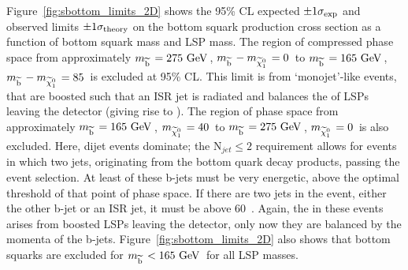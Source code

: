 Figure~\ref{fig:sbottom_limits_2D} shows the 95\% CL expected $\pm 1 \sigma_{\rm exp}$ and observed limits $\pm 1 \sigma_{\rm theory}$ on the bottom squark production cross section 
as a function of bottom squark mass and LSP mass.
The region of compressed phase space from approximately $m_{\widetilde{{\rm b}}\,}=275~\mathrm{GeV}\,$, $m_{\widetilde{{\rm b}}\,} - m_{\widetilde{\chi}^{0}_{1}\,}=0$~\GeV to $m_{\widetilde{{\rm b}}\,}=165~\mathrm{GeV}\,$, $m_{\widetilde{{\rm b}}\,} - m_{\widetilde{\chi}^{0}_{1}\,} = 85 $~\GeV is excluded at 95\% CL. 
This limit is from `monojet'-like events, that are boosted such that an ISR jet is radiated and balances the \pt of LSPs leaving the detector (giving rise to \MET).
The region of phase space from approximately $m_{\widetilde{{\rm b}}\,}=165~\mathrm{GeV}\,$, $m_{\widetilde{\chi}^{0}_{1}\,} = 40$~\GeV to $m_{\widetilde{{\rm b}}\,}=275~\mathrm{GeV}\,$, $m_{\widetilde{\chi}^{0}_{1}\,} = 0$~\GeV is also excluded.
Here, dijet events dominate; the N$_{jet} \leq 2$ requirement allows for events in which two jets, originating from the bottom quark decay products, passing the event selection. 
At least of these b-jets must be very energetic, above the optimal \pt threshold of that point of phase space. If there are two jets in the event, either the other b-jet or an ISR jet, it must be above 60~\GeV. Again, the \MET in these events arises from boosted LSPs leaving the detector, only now they are balanced by the momenta of the b-jets.
Figure~\ref{fig:sbottom_limits_2D} also shows that bottom squarks are excluded for $m_{\widetilde{{\rm b}}\,} < 165~\mathrm{GeV}\,$ for all LSP masses. 


